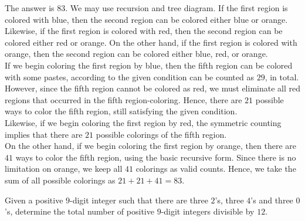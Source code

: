 \begin{solution}
The answer is $83$. We may use recursion and tree diagram. If the first region is colored with blue, then the second region can be colored either blue or orange. Likewise, if the first region is colored with red, then the second region can be colored either red or orange. On the other hand, if the first region is colored with orange, then the second region can be colored either blue, red, or orange.\\
\bigskip
If we begin coloring the first region by blue, then the fifth region can be colored with some pastes, according to the given condition can be counted as $29$, in total. However, since the fifth region cannot be colored as red, we must eliminate all red regions that occurred in the fifth region-coloring. Hence, there are $21$ possible ways to color the fifth region, still satisfying the given condition.\\
\bigskip
Likewise, if we begin coloring the first region by red, the symmetric counting implies that there are $21$ possible colorings of the fifth region.\\
\bigskip
On the other hand, if we begin coloring the first region by orange, then there are $41$ ways to color the fifth region, using the basic recursive form. Since there is no limitation on orange, we keep all $41$ colorings as valid counts. Hence, we take the sum of all possible colorings as $21+21+41=83$.\\ 
\end{solution}

\begin{problem}
Given a positive $9$-digit integer such that there are three $2$'s, three $4$'s and three $0$'s, determine the total number of positive $9$-digit integers divisible by $12$.
\end{problem}

